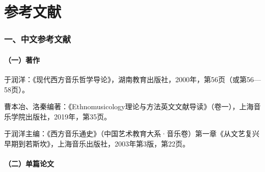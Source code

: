 
\chapter*{参考文献}


\subsection*{一、中文参考文献}

\subsubsection*{（一）著作}

\begin{achievements}
\item 于润洋：《现代西方音乐哲学导论》，湖南教育出版社，2000年，第56页（或第56—58页）。
\item 曹本冶、洛秦编著：《Ethnomusicology理论与方法英文文献导读》（卷一），上海音乐学院出版社，2019年，第35页。
\item 于润洋主编：《西方音乐通史》（中国艺术教育大系·音乐卷）第一章《从文艺复兴早期到若斯坎》，上海音乐出版社，2003年第3版，第22页。
\end{achievements}

\subsubsection*{（二）单篇论文}

